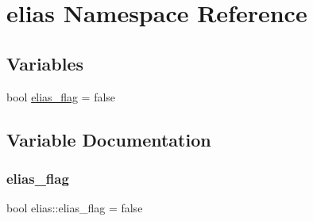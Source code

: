 \hypertarget{namespaceelias}{}\section{elias Namespace Reference}
\label{namespaceelias}
\subsection*{Variables}
\begin{DoxyCompactItemize}
\item 
bool \hyperlink{namespaceelias_a2a4c9029c81abefaad4538ef18a0bdb2}{elias\+\_\+flag} = false
\end{DoxyCompactItemize}


\subsection{Variable Documentation}
\mbox{\label{namespaceelias_a2a4c9029c81abefaad4538ef18a0bdb2}} 
\subsubsection{\texorpdfstring{elias\+\_\+flag}{elias\_flag}}
{\footnotesize\ttfamily bool elias\+::elias\+\_\+flag = false}

